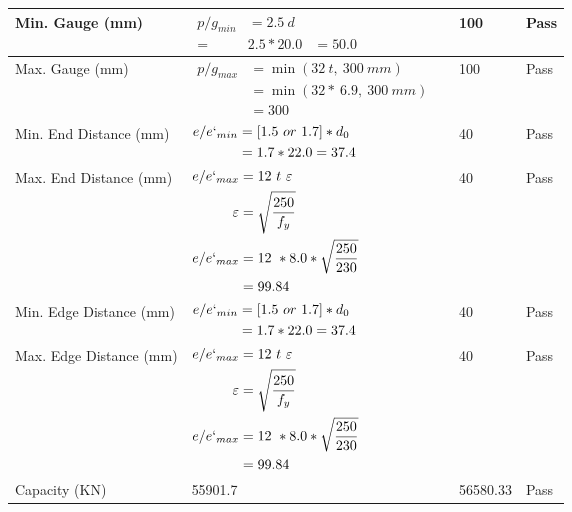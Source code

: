 \documentclass{article}%
\begin{document}
\begin{longtable}{|p{4cm}|p{5cm}|p{5.5cm}|p{1.5cm}|}
\hline%
Min. Gauge (mm)&$\begin{aligned}p/g_{min}&= 2.5 ~ d&\\ =&2.5*20.0&=50.0\end{aligned}$&100&Pass\\%
\hline%
Max. Gauge (mm)&$\begin{aligned}p/g_{max} &=\min(32~t,~300~mm)&\\ &=\min(32 *~6.9,~ 300 ~mm)\\&=300\end{aligned}$&100&Pass\\%
\hline%
Min. End Distance (mm)&$\begin{aligned}e/e`_{min} &=[1.5~or~ 1.7] * d_0\\ &=1.7*22.0=37.4 \end{aligned}$&40&Pass\\%
\hline%
Max. End Distance (mm)&$\begin{aligned}e/e`_{max} &= 12~ t~ \varepsilon&\\ \varepsilon &= \sqrt{\frac{250}{f_y}}\\ e/e`_{max}&=12 ~*8.0*\sqrt{\frac{250}{230}}\\ &=99.84\\ \end{aligned}$&40&Pass\\%
\hline%
Min. Edge Distance (mm)&$\begin{aligned}e/e`_{min} &=[1.5~or~ 1.7] * d_0\\ &=1.7*22.0=37.4 \end{aligned}$&40&Pass\\%
\hline%
Max. Edge Distance (mm)&$\begin{aligned}e/e`_{max} &= 12~ t~ \varepsilon&\\ \varepsilon &= \sqrt{\frac{250}{f_y}}\\ e/e`_{max}&=12 ~*8.0*\sqrt{\frac{250}{230}}\\ &=99.84\\ \end{aligned}$&40&Pass\\%
\hline%
Capacity (KN)&55901.7&56580.33&Pass\\%
\hline%
\end{longtable}

%
\end{document}
